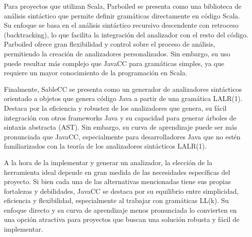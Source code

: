 Para proyectos que utilizan Scala, Parboiled se presenta como una biblioteca de análisis sintáctico que permite definir gramáticas directamente en código Scala. Su enfoque se basa en el análisis sintáctico recursivo descendente con retroceso (backtracking), lo que facilita la integración del analizador con el resto del código. Parboiled ofrece gran flexibilidad y control sobre el proceso de análisis, permitiendo la creación de analizadores personalizados. Sin embargo, su uso puede resultar más complejo que JavaCC para gramáticas simples, ya que requiere un mayor conocimiento de la programación en Scala.

Finalmente, SableCC se presenta como un generador de analizadores sintácticos orientado a objetos que genera código Java a partir de una gramática LALR(1). Destaca por la eficiencia y robustez de los analizadores que genera, su fácil integración con otros frameworks Java y su capacidad para generar árboles de sintaxis abstracta (AST). Sin embargo, su curva de aprendizaje puede ser más pronunciada que JavaCC, especialmente para desarrolladores Java que no estén familiarizados con la teoría de los analizadores sintácticos LALR(1).


A la hora de la implementar y generar un analizador, la elección de la herramienta ideal depende en gran medida de las necesidades específicas del proyecto. Si bien cada una de las alternativas mencionadas tiene sus propias fortalezas y debilidades, JavaCC se destaca por su equilibrio entre simplicidad, eficiencia y flexibilidad, especialmente al trabajar con gramáticas LL(k). Su enfoque directo y su curva de aprendizaje menos pronunciada lo convierten en una opción atractiva para proyectos que buscan una solución robusta y fácil de implementar.


